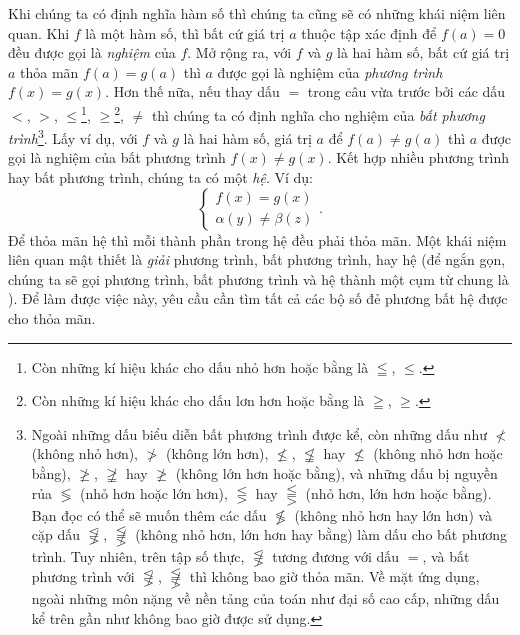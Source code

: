 Khi chúng ta có định nghĩa hàm số thì chúng ta cũng sẽ có những khái niệm liên quan. Khi $f$ là một hàm số, thì bất cứ giá trị $a$ thuộc tập xác định để $f(a) = 0$ đều được gọi là \emph{nghiệm} của $f$. Mở rộng ra, với $f$ và $g$ là hai hàm số, bất cứ giá trị $a$ thỏa mãn $f(a) = g(a)$ thì $a$ được gọi là nghiệm của \emph{phương trình} $f(x) = g(x)$. Hơn thế nữa, nếu thay dấu $=$ trong câu vừa trước bởi các dấu $<$, $>$, $\leq$\footnote{Còn những kí hiệu khác cho dấu nhỏ hơn hoặc bằng là $\leqq$, $\leqslant$.}, $\geq$\footnote{Còn những kí hiệu khác cho dấu lơn hơn hoặc bằng là $\geqq$, $\geqslant$.}, $\neq$ thì chúng ta có định nghĩa cho nghiệm của \emph{bất phương trình}\footnote{Ngoài những dấu biểu diễn bất phương trình được kể, còn những dấu như $\nless$ (không nhỏ hơn), $\ngtr$ (không lớn hơn), $\nleq$, $\not \leqq$ hay $\nleqslant$ (không nhỏ hơn hoặc bằng), $\ngeq$, $\not \geqq$ hay $\ngeqslant$ (không lớn hơn hoặc bằng), và những dấu bị nguyền rủa $\lessgtr$ (nhỏ hơn hoặc lớn hơn), $\lesseqgtr$ hay $\lesseqqgtr$ (nhỏ hơn, lớn hơn hoặc bằng). Bạn đọc có thể sẽ muốn thêm các dấu $\not \lessgtr$ (không nhỏ hơn hay lớn hơn) và cặp dấu $\not \lesseqgtr$, $\not \lesseqqgtr$ (không nhỏ hơn, lớn hơn hay bằng) làm dấu cho bất phương trình. Tuy nhiên, trên tập số thực, $\not \lesseqgtr$ tương đương với dấu $=$, và bất phương trình với $\not \lesseqgtr$, $\not \lesseqqgtr$ thì không bao giờ thỏa mãn. Về mặt ứng dụng, ngoài những môn nặng về nền tảng của toán như đại số cao cấp, những dấu kể trên gần như không bao giờ được sử dụng.}. Lấy ví dụ, với $f$ và $g$ là hai hàm số, giá trị $a$ để $f(a) \neq g(a)$ thì $a$ được gọi là nghiệm của bất phương trình $f(x) \neq g(x)$. Kết hợp nhiều phương trình hay bất phương trình, chúng ta có một \emph{hệ}. Ví dụ:
$$
\begin{cases}
   f(x) = g(x) \\
   \alpha(y) \neq \beta(z)
\end{cases}.
$$
Để thỏa mãn hệ thì mỗi thành phần trong hệ đều phải thỏa mãn. Một khái niệm liên quan mật thiết là \emph{giải} phương trình, bất phương trình, hay hệ (để ngắn gọn, chúng ta sẽ gọi phương trình, bất phương trình và hệ thành một cụm từ chung là ). Để làm được việc này, yêu cầu cần tìm tất cả các bộ số đẻ phương bất hệ được cho thỏa mãn.

